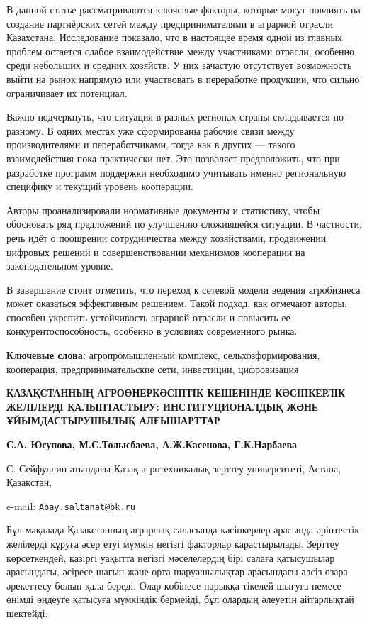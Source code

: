 В данной статье рассматриваются ключевые факторы, которые могут повлиять
на создание партнёрских сетей между предпринимателями в аграрной отрасли
Казахстана. Исследование показало, что в настоящее время одной из
главных проблем остается слабое взаимодействие между участниками
отрасли, особенно среди небольших и средних хозяйств. У них зачастую
отсутствует возможность выйти на рынок напрямую или участвовать в
переработке продукции, что сильно ограничивает их потенциал.

Важно подчеркнуть, что ситуация в разных регионах страны складывается
по-разному. В одних местах уже сформированы рабочие связи между
производителями и переработчиками, тогда как в других --- такого
взаимодействия пока практически нет. Это позволяет предположить, что при
разработке программ поддержки необходимо учитывать именно региональную
специфику и текущий уровень кооперации.

Авторы проанализировали нормативные документы и статистику, чтобы
обосновать ряд предложений по улучшению сложившейся ситуации. В
частности, речь идёт о поощрении сотрудничества между хозяйствами,
продвижении цифровых решений и совершенствовании механизмов кооперации
на законодательном уровне.

В завершение стоит отметить, что переход к сетевой модели ведения
агробизнеса может оказаться эффективным решением. Такой подход, как
отмечают авторы, способен укрепить устойчивость аграрной отрасли и
повысить ее конкурентоспособность, особенно в условиях современного
рынка.

{\bfseries Ключевые слова:} агропромышленный комплекс, сельхозформирования,
кооперация, предпринимательские сети, инвестиции, цифровизация

{\bfseries ҚАЗАҚСТАННЫҢ АГРОӨНЕРКӘСІПТІК КЕШЕНІНДЕ КӘСІПКЕРЛІК ЖЕЛІЛЕРДІ
ҚАЛЫПТАСТЫРУ: ИНСТИТУЦИОНАЛДЫҚ ЖӘНЕ ҰЙЫМДАСТЫРУШЫЛЫҚ АЛҒЫШАРТТАР}

{\bfseries С.А. Юсупова, М.С.Толысбаева, А.Ж.Касенова, Г.К.Нарбаева}

С. Сейфуллин атындағы Қазақ агротехникалық зерттеу университеті, Астана,
Қазақстан,

e-mail:
\href{mailto:Abay.saltanat@bk.ru}{\nolinkurl{Abay.saltanat@bk.ru}}

Бұл мақалада Қазақстанның аграрлық саласында кәсіпкерлер арасында
әріптестік желілерді құруға әсер етуі мүмкін негізгі факторлар
қарастырылады. Зерттеу көрсеткендей, қазіргі уақытта негізгі
мәселелердің бірі салаға қатысушылар арасындағы, әсіресе шағын және орта
шаруашылықтар арасындағы әлсіз өзара әрекеттесу болып қала береді. Олар
көбінесе нарыққа тікелей шығуға немесе өнімді өңдеуге қатысуға мүмкіндік
бермейді, бұл олардың әлеуетін айтарлықтай шектейді.

